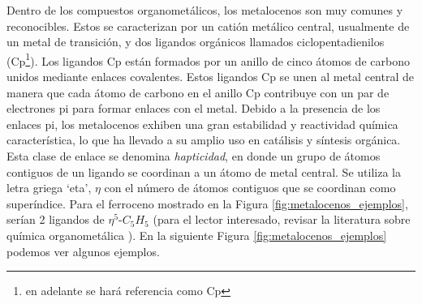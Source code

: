 Dentro de los compuestos organometálicos, los metalocenos son muy comunes y reconocibles. Estos se caracterizan por un catión metálico central, usualmente de un metal de transición, y dos ligandos orgánicos llamados ciclopentadienilos (Cp\footnote{en adelante se hará referencia como Cp}). Los ligandos Cp están formados por un anillo de cinco átomos de carbono unidos mediante enlaces covalentes. Estos ligandos Cp se unen al metal central de manera que cada átomo de carbono en el anillo Cp contribuye con un par de electrones pi para formar enlaces con el metal. Debido a la presencia de los enlaces pi, los metalocenos exhiben una gran estabilidad y reactividad química característica, lo que ha llevado a su amplio uso en catálisis y síntesis orgánica. Esta clase de enlace se denomina \textit{hapticidad}, en donde un grupo de átomos contiguos de un ligando se coordinan a un átomo de metal central. Se utiliza la letra griega `eta', $\eta$ con el número de átomos contiguos que se coordinan como superíndice. Para el ferroceno mostrado en la Figura \ref{fig:metalocenos_ejemplos}, serían 2 ligandos de $\eta^{5}$-$C_{5}H_{5}$ (para el lector interesado, revisar la literatura sobre química organometálica \cite{jose_curso_1995, fajarnes_quimica_1997, osorio-yanez_compuestos_2021, organometallic_hypertextbook, libretext_organometallic_2013}). En la siguiente Figura \ref{fig:metalocenos_ejemplos} podemos ver algunos ejemplos.
